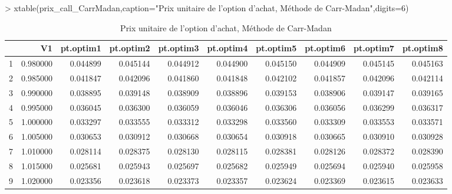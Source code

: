 \documentclass[letter]{report}
\begin{document}
\begin{Schunk}
\begin{Sinput}
> 	xtable(prix_call_CarrMadan,caption="Prix unitaire de l'option d'achat, Méthode de Carr-Madan",digits=6)
\end{Sinput}
% latex table generated in R 3.1.0 by xtable 1.7-3 package
% Tue May 27 23:05:26 2014
\begin{table}[ht]
\centering
\begin{tabular}{rrrrrrrrrr}
  \hline
 & V1 & pt.optim1 & pt.optim2 & pt.optim3 & pt.optim4 & pt.optim5 & pt.optim6 & pt.optim7 & pt.optim8 \\ 
  \hline
1 & 0.980000 & 0.044899 & 0.045144 & 0.044912 & 0.044900 & 0.045150 & 0.044909 & 0.045145 & 0.045163 \\ 
  2 & 0.985000 & 0.041847 & 0.042096 & 0.041860 & 0.041848 & 0.042102 & 0.041857 & 0.042096 & 0.042114 \\ 
  3 & 0.990000 & 0.038895 & 0.039148 & 0.038909 & 0.038896 & 0.039153 & 0.038906 & 0.039147 & 0.039165 \\ 
  4 & 0.995000 & 0.036045 & 0.036300 & 0.036059 & 0.036046 & 0.036306 & 0.036056 & 0.036299 & 0.036317 \\ 
  5 & 1.000000 & 0.033297 & 0.033555 & 0.033312 & 0.033298 & 0.033560 & 0.033309 & 0.033553 & 0.033571 \\ 
  6 & 1.005000 & 0.030653 & 0.030912 & 0.030668 & 0.030654 & 0.030918 & 0.030665 & 0.030910 & 0.030928 \\ 
  7 & 1.010000 & 0.028114 & 0.028375 & 0.028130 & 0.028115 & 0.028381 & 0.028126 & 0.028372 & 0.028390 \\ 
  8 & 1.015000 & 0.025681 & 0.025943 & 0.025697 & 0.025682 & 0.025949 & 0.025694 & 0.025940 & 0.025958 \\ 
  9 & 1.020000 & 0.023356 & 0.023618 & 0.023373 & 0.023357 & 0.023624 & 0.023369 & 0.023615 & 0.023633 \\ 
   \hline
\end{tabular}
\caption{Prix unitaire de l'option d'achat, Méthode de Carr-Madan} 
\end{table}\end{Schunk}
\end{document}
